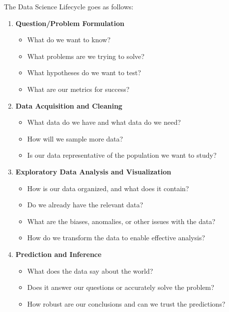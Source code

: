 \documentclass[openany]{book}
\begin{document}
The Data Science Lifecycle goes as follows:
\begin{enumerate}
	\item \textbf{Question/Problem Formulation}
	\begin{itemize}
		\item What do we want to know?
		\item What problems are we trying to solve?
		\item What hypotheses do we want to test?
		\item What are our metrics for success?
	\end{itemize}
	\item \textbf{Data Acquisition and Cleaning}
	\begin{itemize}
		\item What data do we have and what data do we need?
		\item How will we sample more data?
		\item Is our data representative of the population we want to study?
	\end{itemize}
	\item \textbf{Exploratory Data Analysis and Visualization}
	\begin{itemize}
		\item How is our data organized, and what does it contain?
		\item Do we already have the relevant data?
		\item What are the biases, anomalies, or other issues with the data?
		\item How do we transform the data to enable effective analysis?
	\end{itemize}
	\item \textbf{Prediction and Inference}
	\begin{itemize}
		\item What does the data say about the world?
		\item Does it answer our questions or accurately solve the problem?
		\item How robust are our conclusions and can we trust the predictions?
	\end{itemize}
\end{enumerate}
\end{document}

